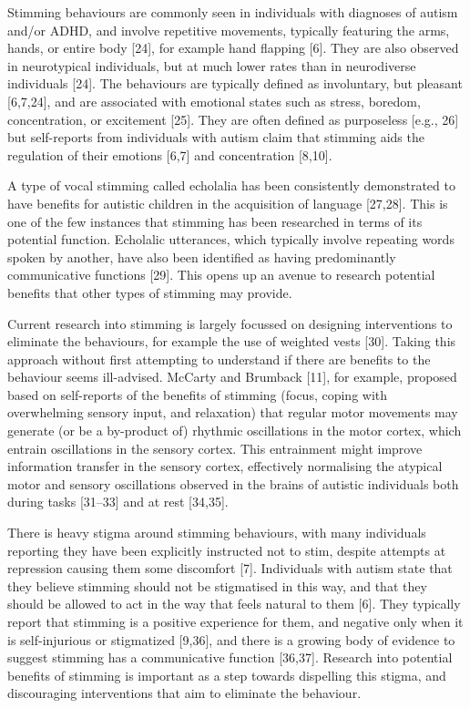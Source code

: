 \documentclass[
  letterpaper,
  DIV=11,
  numbers=noendperiod]{scrartcl}
\begin{document}
Stimming behaviours are commonly seen in individuals with diagnoses of
autism and/or ADHD, and involve repetitive movements, typically
featuring the arms, hands, or entire body {[}24{]}, for example hand
flapping {[}6{]}. They are also observed in neurotypical individuals,
but at much lower rates than in neurodiverse individuals {[}24{]}. The
behaviours are typically defined as involuntary, but pleasant
{[}6,7,24{]}, and are associated with emotional states such as stress,
boredom, concentration, or excitement {[}25{]}. They are often defined
as purposeless {[}e.g., 26{]} but self-reports from individuals with
autism claim that stimming aids the regulation of their emotions
{[}6,7{]} and concentration {[}8,10{]}.

A type of vocal stimming called echolalia has been consistently
demonstrated to have benefits for autistic children in the acquisition
of language {[}27,28{]}. This is one of the few instances that stimming
has been researched in terms of its potential function. Echolalic
utterances, which typically involve repeating words spoken by another,
have also been identified as having predominantly communicative
functions {[}29{]}. This opens up an avenue to research potential
benefits that other types of stimming may provide.

Current research into stimming is largely focussed on designing
interventions to eliminate the behaviours, for example the use of
weighted vests {[}30{]}. Taking this approach without first attempting
to understand if there are benefits to the behaviour seems ill-advised.
McCarty and Brumback {[}11{]}, for example, proposed based on
self-reports of the benefits of stimming (focus, coping with
overwhelming sensory input, and relaxation) that regular motor movements
may generate (or be a by-product of) rhythmic oscillations in the motor
cortex, which entrain oscillations in the sensory cortex. This
entrainment might improve information transfer in the sensory cortex,
effectively normalising the atypical motor and sensory oscillations
observed in the brains of autistic individuals both during tasks
{[}31--33{]} and at rest {[}34,35{]}.

There is heavy stigma around stimming behaviours, with many individuals
reporting they have been explicitly instructed not to stim, despite
attempts at repression causing them some discomfort {[}7{]}. Individuals
with autism state that they believe stimming should not be stigmatised
in this way, and that they should be allowed to act in the way that
feels natural to them {[}6{]}. They typically report that stimming is a
positive experience for them, and negative only when it is
self-injurious or stigmatized {[}9,36{]}, and there is a growing body of
evidence to suggest stimming has a communicative function {[}36,37{]}.
Research into potential benefits of stimming is important as a step
towards dispelling this stigma, and discouraging interventions that aim
to eliminate the behaviour.
\end{document}
